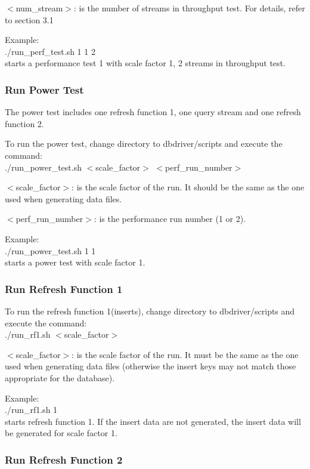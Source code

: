 \documentclass{article}
\begin{document}
\noindent
$<$num\_stream$>$: is the number of streams in throughput test.  For
details, refer to section 3.1

Example: \\
\indent ./run\_perf\_test.sh 1 1 2 \\
\indent starts a performance test 1 with scale factor 1, 2 streams in throughput test.  

\subsubsection{Run Power Test}

\noindent
The power test includes one refresh function 1, one query stream and
one refresh function 2. 

\noindent
To run the power test, change directory to dbdriver/scripts and
execute the command: \\
\indent ./run\_power\_test.sh  $<$scale\_factor$>$ $<$perf\_run\_number$>$ 

\noindent
$<$scale\_factor$>$: is the scale factor of the run.  It should be the same
as the one used when generating data files.

\noindent
$<$perf\_run\_number$>$: is the performance run number (1 or 2).  

\noindent
Example: \\
\indent ./run\_power\_test.sh 1 1 \\
\indent starts a power test  with scale factor 1.  

\subsubsection{Run Refresh Function 1}

\noindent
To run the refresh function 1(inserts), change directory to
dbdriver/scripts and execute the command: \\
\indent ./run\_rf1.sh  $<$scale\_factor$>$ 

\noindent
$<$scale\_factor$>$: is the scale factor of the run.  It must be the same
as the one used when generating data files (otherwise the insert keys
may not match those appropriate for the database).

\noindent
Example: \\
\indent ./run\_rf1.sh 1 \\
\indent starts refresh function 1.  If the insert data are not generated,  the insert data will be generated for scale factor 1.  

\subsubsection{Run Refresh Function 2}
\end{document}
